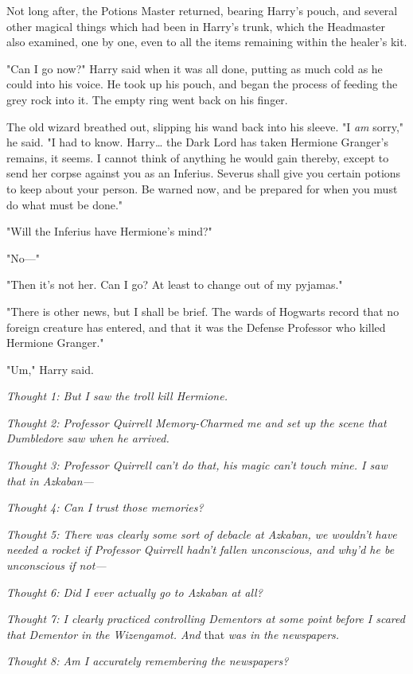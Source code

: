 Not long after, the Potions Master returned, bearing Harry's pouch, and several 
other magical things which had been in Harry's trunk, which the Headmaster also 
examined, one by one, even to all the items remaining within the healer's kit.

"Can I go now?" Harry said when it was all done, putting as much cold as he 
could into his voice. He took up his pouch, and began the process of feeding 
the grey rock into it. The empty ring went back on his finger.

The old wizard breathed out, slipping his wand back into his sleeve. "I 
\emph{am} sorry," he said. "I had to know. Harry{\ldots} the Dark Lord has 
taken Hermione Granger's remains, it seems. I cannot think of anything he would 
gain thereby, except to send her corpse against you as an Inferius. Severus 
shall give you certain potions to keep about your person. Be warned now, and be 
prepared for when you must do what must be done."

"Will the Inferius have Hermione's mind?"

"No---"

"Then it's not her. Can I go? At least to change out of my pyjamas."

"There is other news, but I shall be brief. The wards of Hogwarts record that 
no foreign creature has entered, and that it was the Defense Professor who 
killed Hermione Granger."

"Um," Harry said.

\emph{Thought 1: But I saw the troll kill Hermione.}

\emph{Thought 2: Professor Quirrell Memory-Charmed me and set up the scene that 
Dumbledore saw when he arrived.}

\emph{Thought 3: Professor Quirrell can't do that, his magic can't touch mine. 
I saw that in Azkaban---}

\emph{Thought 4: Can I trust those memories?}

\emph{Thought 5: There was clearly some sort of debacle at Azkaban, we wouldn't 
have needed a rocket if Professor Quirrell hadn't fallen unconscious, and why'd 
he be unconscious if not---}

\emph{Thought 6: Did I ever actually go to Azkaban at all?}

\emph{Thought 7: I clearly practiced controlling Dementors at some point before 
I scared that Dementor in the Wizengamot. And} that\emph{ was in the 
newspapers.}

\emph{Thought 8: Am I accurately remembering the newspapers?}

